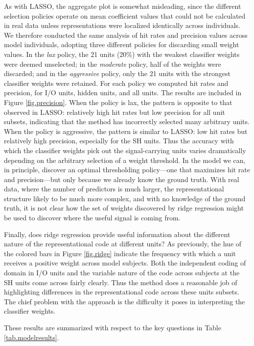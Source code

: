 As with LASSO, the aggregate plot is somewhat misleading, since the different selection policies operate on mean coefficient values that could not be calculated in real data unless representations were localized identically across individuals. We therefore conducted the same analysis of hit rates and precision values across model individuals, adopting three different policies for discarding small weight values. In the {\em lax} policy, the 21 units (20\%) with the weakest classifier weights were deemed unselected; in the {\em moderate} policy, half of the weights were discarded; and in the {\em aggressive} policy, only the 21 units with the strongest classifier weights were retained. For each policy we computed hit rates and precision, for I/O units, hidden units, and all units. The results are included in Figure \ref{fig.precision}. When the policy is lax, the pattern is opposite to that observed in LASSO: relatively high hit rates but low precision for all unit subsets, indicating that the method has incorrectly selected many arbitrary units. When the policy is aggressive, the pattern is similar to LASSO: low hit rates but relatively high precision, especially for the SH units. Thus the accuracy with which the classifier weights pick out the signal-carrying units varies dramatically depending on the arbitrary selection of a weight threshold. In the model we can, in principle, discover an optimal thresholding policy---one that maximizes hit rate and precision---but only because we already know the ground truth. With real data, where the number of predictors is much larger, the representational structure likely to be much more complex, and with no knowledge of the ground truth, it is not clear how the set of weights discovered by ridge regression might be used to discover where the useful signal is coming from.  

Finally, does ridge regression provide useful information about the different nature of the representational code at different units? As previously, the hue of the colored bars in Figure \ref{fig.ridge} indicate the frequency with which a unit receives a positive weight across model subjects. Both the independent coding of domain in I/O units and the variable nature of the code across subjects at the SH units come across fairly clearly. Thus the method does a reasonable job of highlighting differences in the representational code across these units subsets. The chief problem with the approach is the difficulty it poses in interpreting the classifier weights. 

These results are summarized with respect to the key questions in Table \ref{tab.modelresults}.

